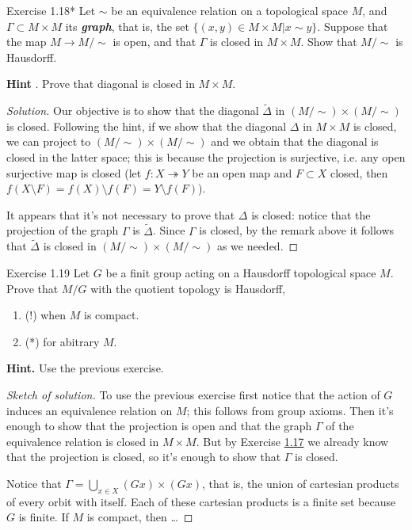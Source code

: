 \begin{thing4}{Exercise 1.18*}\leavevmode
	Let $\sim$ be an equivalence relation on a topological space $M$, and $\Gamma \subset M \times M$ its \textit{\textbf{graph}}, that is, the set $\{(x,y) \in M \times M|x \sim y\}$. Suppose that the map $M \longrightarrow M/\sim$ is open, and that $\Gamma$ is closed in $M \times M$. Show that $M/\sim$ is Hausdorff.

	\textbf{Hint} . Prove that diagonal is closed in $M \times M$.
\end{thing4}

\begin{proof}[Solution]\leavevmode
Our objective is to show that the diagonal $\tilde{\Delta}$ in $(M/\sim)\times(M/\sim)$ is closed. Following the hint, if we show that the diagonal $\Delta$ in $ M \times M$ is closed, we can project to $(M/\sim) \times (M/\sim)$ and we obtain that the diagonal is closed in the latter space; this is because the projection is surjective, i.e. any open surjective map is closed (let $f:X \twoheadrightarrow Y$ be an open map and $F\subset X$ closed, then $f(X\setminus F)=f(X)\setminus f(F)=Y\setminus f(F)$).

It appears that it's not necessary to prove that $\Delta$ is closed: notice that the projection of the graph $\Gamma$ is $\tilde{\Delta}$. Since $\Gamma$ is closed, by the remark above it follows that $\tilde{\Delta}$ is closed in $(M/\sim)\times(M/\sim)$ as we needed.
\end{proof}

\begin{thing4}{Exercise 1.19}\label{exer:1.19}\leavevmode
	Let $G$ be a finit group acting on a Hausdorff topological space $M$. Prove that $M/G$ with the quotient topology is Hausdorff,
	\begin{enumerate}[label=(\alph*)]
	\item (!) when $M$ is compact.
	\item  (*) for abitrary $M$.
	\end{enumerate}
	\textbf{Hint.} Use the previous exercise.
\end{thing4}

\begin{proof}[Sketch of solution]\leavevmode
To use the previous exercise first notice that the action of $G$ induces an equivalence relation on $M$; this follows from group axioms. Then it's enough to show that the projection is open and that the graph $\Gamma$ of the equivalence relation is closed in $M\times M$. But by Exercise \hyperref[exer:1.17]{1.17} we already know that the projection is closed, so it's enough to show that $\Gamma$ is closed.

Notice that $\Gamma=\bigcup_{x \in X} (Gx)\times (Gx)$, that is, the union of cartesian products of every orbit with itself. Each of these cartesian products is a finite set because $G$ is finite. If $M$ is compact, then {\color{2}…}
\end{proof}


